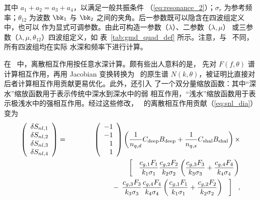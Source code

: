 \noindent 
其中 $a_1 + a_2 = a_3 + a_4$，以满足一般共振条件
（\ref{eq:resonance_2}）；$\sigma_r$ 为参考频率；$\theta_{12}$ 为波数
$\bk_1$ 与 $\bk_2$ 之间的夹角。后一参数既可以隐含在四波组定义中，也可以
作为显式可调参数。由此可构造一参数（$\lambda$）、二参数（$\lambda,\mu$）
或三参数（$\lambda, \mu, \theta_{12}$）四波组定义，如
表~\ref{tab:gmd_quad_def} 所示。注意，与 \dia\ 不同，所有四波组均在实际
水深和频率下进行计算。

在 \gmd\ 中，离散相互作用按任意水深计算。颇有些出人意料的是，
先对 $F(f, \theta)$ 谱计算相互作用，再用 Jacobian 变换转换为 \ws\ 的原生谱
$N(k, \theta)$，被证明比直接对后者计算相互作用贡献更易优化。此外，还引入
了一个双分量缩放函数：其中“深水”缩放函数用于表示传统中深水到深水中的弱
相互作用，“浅水”缩放函数用于表示极浅水中的强相互作用。经过这些修改，
\dia\ 的离散相互作用贡献（\ref{eq:snl_dia}）变为
\begin{eqnarray}
\left ( \begin{array}{c}
  \delta S_{nl,1} \\ \delta S_{nl,2} \\ \delta S_{nl,3} \\ \delta S_{nl,4} 
\end{array} \right )  & = &  
\left ( \begin{array}{r} -1 \\  -1 \\ 1 \\ 1 \end{array} \right )
  \left ( \frac{1}{n_{q,d}} C_{\rm{deep}} B_{\rm{deep}} + 
          \frac{1}{n_{q,s}} C_{\rm{shal}} B_{\rm{shal}} \right ) \times \nonumber \\
 &  & \hspace{20mm} \left [ \:\:\:\:
                    \frac{c_{g,1}F_1}{k_1 \sigma_1} 
                    \frac{c_{g,2}F_2}{k_2 \sigma_2} \left ( 
                    \frac{c_{g,3}F_3}{k_3 \sigma_3} +
                    \frac{c_{g,4}F_4}{k_4 \sigma_4} \right )
                                                         \right . \nonumber \\
 &  &  \hspace{20mm} \left . - \:\:
                    \frac{c_{g,3}F_3}{k_3 \sigma_3} 
                    \frac{c_{g,4}F_4}{k_4 \sigma_4} \left ( 
                    \frac{c_{g,1}F_1}{k_1 \sigma_1} + 
                    \frac{c_{g,2}F_2}{k_2 \sigma_2} \right ) \:\:\:\:
                                                    \right ] \:\:\:
, \label{eq:gmd_dsnl} 
\end{eqnarray}

